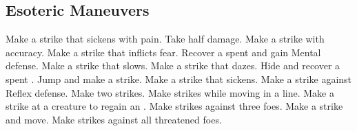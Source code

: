 
\small
\subsection{Esoteric Maneuvers}\label{Esoteric Maneuvers}
\begin{spelllist}
 Make a strike that sickens with pain.
 Take half damage.
 Make a strike with  accuracy.
 Make a strike that inflicts fear.
 Recover a spent  and gain  Mental defense.
 Make a strike that slows.
 Make a strike that dazes.
 Hide and recover a spent .
 Jump and make a strike.
 Make a strike that sickens.
 Make a strike against Reflex defense.
 Make two strikes.
 Make strikes while moving in a line.
 Make a strike at a creature to regain an .
 Make strikes against three foes.
 Make a strike and move.
 Make strikes against all threatened foes.
\end{spelllist}



\small
